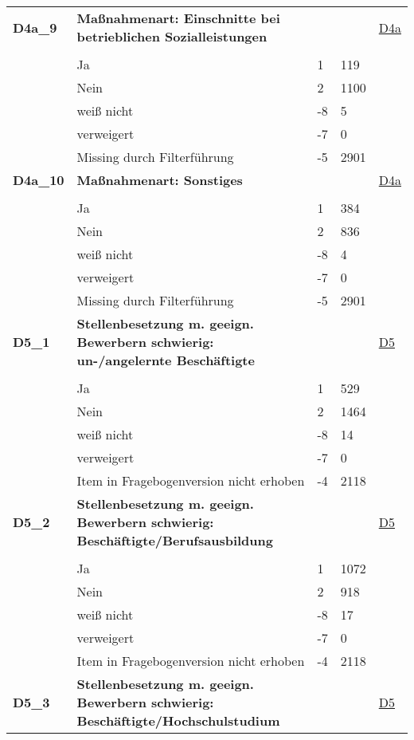 \begin{longtable}{| L{2.5cm} | L{8.25cm}| C{1.5cm} | R{1.25cm} | C{2.25cm} |  }
   \midrule
\textbf{D4a\_9}\label{var:suf:D4a:9} & \textbf{Maßnahmenart: Einschnitte bei betrieblichen Sozialleistungen} &  &  & \hyperref[D4a]{D4a} \\ 
   &  &  &  &  \\ 
   & Ja & 1 & 119 &  \\ 
   & Nein & 2 & 1100 &  \\ 
   & weiß nicht & -8 & 5 &  \\ 
   & verweigert & -7 & 0 &  \\ 
   & Missing durch Filterführung & -5 & 2901 &  \\ 
   \midrule
\textbf{D4a\_10}\label{var:suf:D4a:10} & \textbf{Maßnahmenart: Sonstiges} &  &  & \hyperref[D4a]{D4a} \\ 
   &  &  &  &  \\ 
   & Ja & 1 & 384 &  \\ 
   & Nein & 2 & 836 &  \\ 
   & weiß nicht & -8 & 4 &  \\ 
   & verweigert & -7 & 0 &  \\ 
   & Missing durch Filterführung & -5 & 2901 &  \\ 
   \midrule
\textbf{D5\_1}\label{var:suf:D5:1} & \textbf{Stellenbesetzung m. geeign. Bewerbern schwierig: un-/angelernte Beschäftigte} &  &  & \hyperref[D5]{D5} \\ 
   &  &  &  &  \\ 
   & Ja & 1 & 529 &  \\ 
   & Nein & 2 & 1464 &  \\ 
   & weiß nicht & -8 & 14 &  \\ 
   & verweigert & -7 & 0 &  \\ 
   & Item in Fragebogenversion nicht erhoben & -4 & 2118 &  \\ 
   \midrule
\textbf{D5\_2}\label{var:suf:D5:2} & \textbf{Stellenbesetzung m. geeign. Bewerbern schwierig: Beschäftigte/Berufsausbildung} &  &  & \hyperref[D5]{D5} \\ 
   &  &  &  &  \\ 
   & Ja & 1 & 1072 &  \\ 
   & Nein & 2 & 918 &  \\ 
   & weiß nicht & -8 & 17 &  \\ 
   & verweigert & -7 & 0 &  \\ 
   & Item in Fragebogenversion nicht erhoben & -4 & 2118 &  \\ 
   \midrule
\textbf{D5\_3}\label{var:suf:D5:3} & \textbf{Stellenbesetzung m. geeign. Bewerbern schwierig: Beschäftigte/Hochschulstudium} &  &  & \hyperref[D5]{D5} \\ 

\end{longtable}
